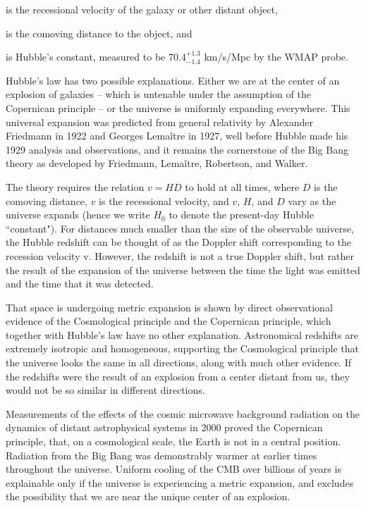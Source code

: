 \documentclass[14pt, oneside]{book}
\begin{document}
			\begin{description}[align=right]
				\item[$v$] is the recessional velocity of the galaxy or other distant object,
				\item[$D$] is the comoving distance to the object, and
				\item[$H_{0}$] is Hubble's constant, measured to be $70.4^{+1.3}_{-1.4}$ km/s/Mpc by the WMAP probe.
			\end{description}
			
			Hubble's law has two possible explanations. Either we are at the center of an explosion of galaxies -- which is untenable under the assumption of the Copernican principle -- or the universe is uniformly expanding everywhere. This universal expansion was predicted from general relativity by Alexander Friedmann in 1922 and Georges Lemaître in 1927, well before Hubble made his 1929 analysis and observations, and it remains the cornerstone of the Big Bang theory as developed by Friedmann, Lemaître, Robertson, and Walker.
			
			The theory requires the relation $v=HD$ to hold at all times, where $D$ is the comoving distance, $v$ is the recessional velocity, and $v$, $H$, and $D$ vary as the universe expands (hence we write $H_{0}$ to denote the present-day Hubble ``constant"). For distances much smaller than the size of the observable universe, the Hubble redshift can be thought of as the Doppler shift corresponding to the recession velocity v. However, the redshift is not a true Doppler shift, but rather the result of the expansion of the universe between the time the light was emitted and the time that it was detected.
			
			That space is undergoing metric expansion is shown by direct observational evidence of the Cosmological principle and the Copernican principle, which together with Hubble's law have no other explanation. Astronomical redshifts are extremely isotropic and homogeneous, supporting the Cosmological principle that the universe looks the same in all directions, along with much other evidence. If the redshifts were the result of an explosion from a center distant from us, they would not be so similar in different directions.
			
			Measurements of the effects of the cosmic microwave background radiation on the dynamics of distant astrophysical systems in 2000 proved the Copernican principle, that, on a cosmological scale, the Earth is not in a central position. Radiation from the Big Bang was demonstrably warmer at earlier times throughout the universe. Uniform cooling of the CMB over billions of years is explainable only if the universe is experiencing a metric expansion, and excludes the possibility that we are near the unique center of an explosion.
	
\end{document}
